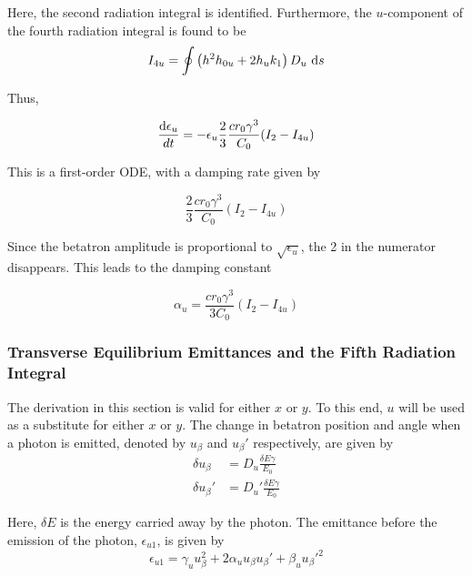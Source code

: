 Here, the second radiation integral is identified. Furthermore, the $u$-component of the fourth radiation integral is found to be
\begin{equation}
    I_{4u} = \oint \left( h^2 h_{0u} + 2 h_u k_1 \right) D_u\ \text{d} s
\end{equation}

Thus,

\begin{equation}
    \frac{\text{d} \epsilon_u}{dt} = - \epsilon_u \frac{2}{3} \frac{c r_0 \gamma^3}{C_0} (I_2 - I_{4u})
\end{equation}

This is a first-order ODE, with a damping rate given by

\begin{equation}
    \frac{2}{3} \frac{c r_0 \gamma^3}{C_0} (I_2 - I_{4u})
\end{equation}

Since the betatron amplitude is proportional to $\sqrt{\epsilon_u}$, the 2 in the numerator disappears. This leads to the damping constant

\begin{equation}
    \alpha_u = \frac{c r_0 \gamma^3}{3C_0} (I_2 - I_{4u})
\end{equation}

\subsubsection{Transverse Equilibrium Emittances and the Fifth Radiation Integral}
\label{sec:transverseeqemiti5}

The derivation in this section is valid for either $x$ or $y$. To this end, $u$ will be used as a substitute for either $x$ or $y$. The change in betatron position and angle when a photon is emitted, denoted by $u_\beta$ and $u_\beta'$ respectively, are given by
\begin{align}
    \delta u_\beta  &= D_u  \frac{\delta E\gamma}{E_0}
    \label{eq:deltaubeta}\\
    \delta u_\beta' &= D_u' \frac{\delta E\gamma}{E_0}
    \label{eq:deltaubetaprime}
\end{align}

Here, $\delta E$ is the energy carried away by the photon. The emittance before the emission of the photon, $\epsilon_{u1}$, is given by
\begin{equation}
    \epsilon_{u1} = \gamma_u u_\beta^2 + 2 \alpha_u u_\beta u_\beta' + \beta_u u_\beta'^2
\end{equation}

